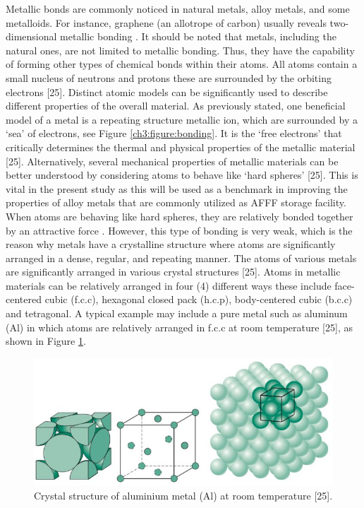 \documentclass[12pt]{report}
\begin{document}
Metallic bonds are commonly noticed in natural metals, alloy metals, and some metalloids. For instance, graphene (an allotrope of carbon) usually reveals two-dimensional metallic bonding \cite{lepetit2017topological}. It should be noted that metals, including the natural ones, are not limited to metallic bonding. Thus, they have the capability of forming other types of chemical bonds within their atoms.
All atoms contain a small nucleus of neutrons and protons these are surrounded by the orbiting electrons [25]. Distinct atomic models can be significantly used to describe different properties of the overall material. As previously stated, one beneficial model of a metal is a repeating structure metallic ion, which are surrounded by a ‘sea’ of electrons, see Figure \ref{ch3:figure:bonding}. It is the ‘free electrons’ that critically determines the thermal and physical properties of the metallic material [25]. Alternatively, several mechanical properties of metallic materials can be better understood by considering atoms to behave like ‘hard spheres’ [25]. This is vital in the present study as this will be used as a benchmark in improving the properties of alloy metals that are commonly utilized as AFFF storage facility.
When atoms are behaving like hard spheres, they are relatively bonded together by an attractive force \cite{lepetit2017topological}. However, this type of bonding is very weak, which is the reason why metals have a crystalline structure where atoms are significantly arranged in a dense, regular, and repeating manner. The atoms of various metals are significantly arranged in various crystal structures [25]. Atoms in metallic materials can be relatively arranged in four (4) different ways these include face-centered cubic (f.c.c), hexagonal closed pack (h.c.p), body-centered cubic (b.c.c) and tetragonal. A typical example may include a pure metal such as aluminum (Al) in which atoms are relatively arranged in f.c.c at room temperature [25], as shown in Figure \ref{ch3:figure:aluminium}.
 
\begin{figure}[H]
    \centering
    \includegraphics[width=\textwidth]{aluminium_crystal_structure.jpg}
    \caption{Crystal structure of aluminium metal (Al) at room temperature [25].}
    \label{ch3:figure:aluminium}
\end{figure}
\end{document}
